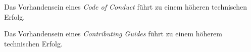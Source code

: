 \begin{hypothesis}
    Das Vorhandensein eines \textit{Code of Conduct} führt zu einem höheren technischen Erfolg.
    \label{H:4}
\end{hypothesis}


\begin{hypothesis}
    Das Vorhandensein eines \textit{Contributing Guides} führt zu einem höherem technischen Erfolg.
    \label{H:5}
\end{hypothesis}




